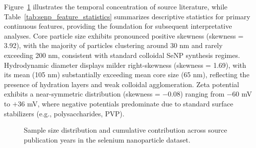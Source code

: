 Figure~\ref{fig:senp-year-distribution} illustrates the temporal concentration of source literature, while Table~\ref{tab:senp_feature_statistics} summarizes descriptive statistics for primary continuous features, providing the foundation for subsequent interpretative analyses. Core particle size exhibits pronounced positive skewness (skewness = 3.92), with the majority of particles clustering around 30 nm and rarely exceeding 200 nm, consistent with standard colloidal SeNP synthesis regimes. Hydrodynamic diameter displays milder right-skewness (skewness = 1.69), with its mean (105 nm) substantially exceeding mean core size (65 nm), reflecting the presence of hydration layers and weak colloidal agglomeration. Zeta potential exhibits a near-symmetric distribution (skewness = $-0.08$) ranging from $-60$ mV to $+36$ mV, where negative potentials predominate due to standard surface stabilizers (e.g., polysaccharides, PVP).

\begin{figure}[H]
  \centering
  \begin{minipage}{0.48\linewidth}
    \centering
  \end{minipage}
  \hfill
  \begin{minipage}{0.48\linewidth}
    \centering
  \end{minipage}
  \caption{Sample size distribution and cumulative contribution across source publication years in the selenium nanoparticle dataset.}
  \label{fig:senp-year-distribution}
\end{figure}

